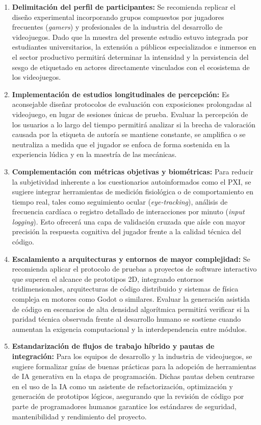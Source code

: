 \begin{enumerate}
    \item \textbf{Delimitación del perfil de participantes:} Se recomienda replicar el diseño experimental incorporando grupos compuestos por jugadores frecuentes (\textit{gamers}) y profesionales de la industria del desarrollo de videojuegos. Dado que la muestra del presente estudio estuvo integrada por estudiantes universitarios, la extensión a públicos especializados e inmersos en el sector productivo permitirá determinar la intensidad y la persistencia del sesgo de etiquetado en actores directamente vinculados con el ecosistema de los videojuegos.
    \item \textbf{Implementación de estudios longitudinales de percepción:} Es aconsejable diseñar protocolos de evaluación con exposiciones prolongadas al videojuego, en lugar de sesiones únicas de prueba. Evaluar la percepción de los usuarios a lo largo del tiempo permitirá analizar si la brecha de valoración causada por la etiqueta de autoría se mantiene constante, se amplifica o se neutraliza a medida que el jugador se enfoca de forma sostenida en la experiencia lúdica y en la maestría de las mecánicas.
    \item \textbf{Complementación con métricas objetivas y biométricas:} Para reducir la subjetividad inherente a los cuestionarios autoinformados como el PXI, se sugiere integrar herramientas de medición fisiológica o de comportamiento en tiempo real, tales como seguimiento ocular (\textit{eye-tracking}), análisis de frecuencia cardíaca o registro detallado de interacciones por minuto (\textit{input logging}). Esto ofrecerá una capa de validación cruzada que aísle con mayor precisión la respuesta cognitiva del jugador frente a la calidad técnica del código.
    \item \textbf{Escalamiento a arquitecturas y entornos de mayor complejidad:} Se recomienda aplicar el protocolo de pruebas a proyectos de software interactivo que superen el alcance de prototipos 2D, integrando entornos tridimensionales, arquitecturas de código distribuido y sistemas de física compleja en motores como Godot o similares. Evaluar la generación asistida de código en escenarios de alta densidad algorítmica permitirá verificar si la paridad técnica observada frente al desarrollo humano se sostiene cuando aumentan la exigencia computacional y la interdependencia entre módulos.
    \item \textbf{Estandarización de flujos de trabajo híbrido y pautas de integración:} Para los equipos de desarrollo y la industria de videojuegos, se sugiere formalizar guías de buenas prácticas para la adopción de herramientas de IA generativa en la etapa de programación. Dichas pautas deben centrarse en el uso de la IA como un asistente de refactorización, optimización y generación de prototipos lógicos, asegurando que la revisión de código por parte de programadores humanos garantice los estándares de seguridad, mantenibilidad y rendimiento del proyecto.

\end{enumerate}
